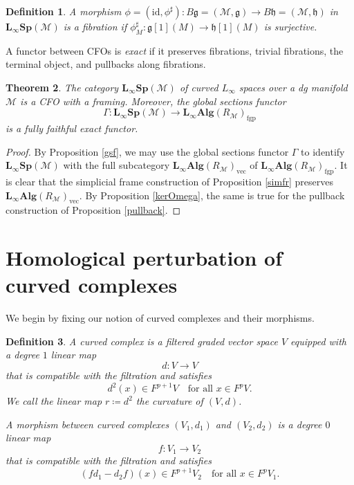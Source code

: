 \documentclass[12pt]{amsart}
\newtheorem{defn}{Definition}[section]
\newtheorem{thm}[defn]{Theorem}
\numberwithin{equation}{section}
\theoremstyle{plain}
\newcommand{\fg}{\mathfrak{g}}
\newcommand{\fh}{\mathfrak{h}}
\newcommand{\sM}{\mathcal{M}}
\newcommand{\id}{\mathrm{id}}
\begin{document}
	\begin{defn}
		A morphism $\phi=(\id, \phi^\sharp)\colon B\fg=(\sM, \fg) \rightarrow B\fh=(\sM, \fh)$ in $\mathbf{L_\infty Sp}(\sM)$ is a \emph{fibration} if $\phi^\sharp_M\colon \fg[1](M) \rightarrow \fh[1](M)$ is surjective.
	\end{defn}
	
	A functor between CFOs is \emph{exact} if it preserves fibrations, trivial fibrations, the terminal object, and pullbacks along fibrations. 
	
	\begin{thm}
		The category $\mathbf{L_\infty Sp}(\sM)$ of curved $L_\infty$ spaces over a dg manifold $\sM$ is a CFO with a framing. Moreover, the global sections functor
		\[
		\Gamma\colon \mathbf{L_\infty Sp}(\sM) \longrightarrow \mathbf{L_\infty Alg}(R_\sM)_{\mathrm{fgp}}
		\]
		is a fully faithful exact functor.
	\end{thm}
	\begin{proof}
		By Proposition \ref{gsf}, we may use the global sections functor $\Gamma$ to identify $\mathbf{L_\infty Sp}(\sM)$ with the full subcategory $\mathbf{L_\infty Alg}(R_\sM)_{\mathrm{vec}}$ of $\mathbf{L_\infty Alg}(R_\sM)_{\mathrm{fgp}}$. It is clear that the simplicial frame construction of Proposition \ref{simfr} preserves $\mathbf{L_\infty Alg}(R_\sM)_{\mathrm{vec}}$. By Proposition \ref{kerOmega}, the same is true for the pullback construction of Proposition \ref{pullback}.
	\end{proof}
	

	
	
	\appendix
	
	\section{Homological perturbation of curved complexes}\label{sec:hpt}
	
	We begin by fixing our notion of curved complexes and their morphisms.
	\begin{defn}
		A \emph{curved complex} is a filtered graded vector space $V$ equipped with a degree $1$ linear map
		\[
		d\colon V \longrightarrow V
		\]
		that is compatible with the filtration and satisfies
		\[
		d^2(x) \in F^{p+1}V \quad \text{for all } x \in F^pV.
		\]
		We call the linear map $r \coloneqq d^2$ the \emph{curvature} of $(V,d)$.
		
		A \emph{morphism} between curved complexes $(V_1, d_1)$ and $(V_2, d_2)$ is a degree $0$ linear map
		\[
		f\colon V_1 \longrightarrow V_2
		\]
		that is compatible with the filtration and satisfies
		\[
		(f d_1 - d_2f)(x)  \in F^{p+1}V_2 \quad \text{for all } x \in F^pV_1.
		\]
	\end{defn}
	
\end{document}
